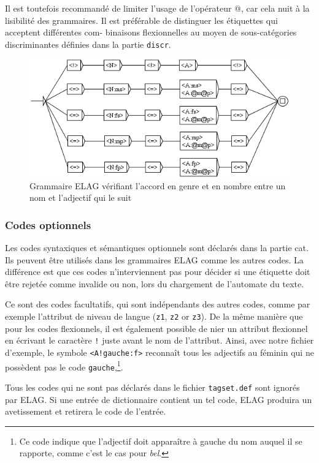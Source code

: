 \bigskip
\noindent Il est toutefois recommandé de limiter l’usage de l’opérateur @, car cela nuit à la lisibilité
des grammaires. Il est préférable de distinguer les étiquettes qui acceptent différentes com-
binaisons flexionnelles au moyen de sous-catégories discriminantes définies dans la partie
\verb$discr$.

\begin{figure}[!h]
\begin{center}
\includegraphics[width=12cm]{resources/img/fig7-19.png}
\caption{Grammaire ELAG vérifiant l’accord en genre et en nombre entre un nom et l’adjectif qui le suit
\label{fig-NA}}
\end{center}
\end{figure}

\subsubsection{Codes optionnels}
Les codes syntaxiques et sémantiques optionnels sont déclarés dans la partie cat. Ils
peuvent être utilisés dans les grammaires ELAG comme les autres codes. La différence est
que ces codes n’interviennent pas pour décider si une étiquette doit être rejetée comme
invalide ou non, lors du chargement de l’automate du texte.


\bigskip
\noindent Ce sont des codes facultatifs, qui sont indépendants des autres codes, 
comme par exemple l’attribut de niveau de langue (\verb$z1$, \verb$z2$ or \verb$z3$). 
De la même manière que pour les codes flexionnels, il est également possible de nier
un attribut flexionnel en écrivant le caractère \verb$!$ juste avant le nom de l’attribut.
Ainsi, avec notre fichier d’exemple, le symbole \verb$<A!gauche:f>$ reconnaît tous les
adjectifs au féminin qui ne possèdent pas le code \verb$gauche$,\footnote{Ce code indique 
que l’adjectif doit apparaître à gauche du nom auquel il se rapporte, comme c’est le cas
pour \textit{bel}.}.

\bigskip
\noindent Tous les codes qui ne sont pas déclarés dans le fichier
\verb$tagset.def$ sont ignorés par ELAG. Si une entrée de
dictionnaire contient un tel code, ELAG produira un avetissement et retirera le code de l’entrée.


